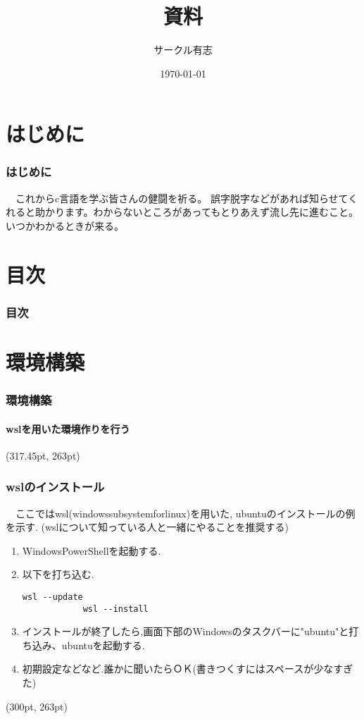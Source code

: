 \documentclass[dvipdfmx]{beamer}
\title{資料}
\author{サークル有志}
\date{\today}
\begin{document}
\begin{frame}[plain]
    \frametitle{}
    \titlepage
\end{frame}

\section{はじめに}
\begin{frame}[c]
    \frametitle{はじめに}
    　これからc言語を学ぶ皆さんの健闘を祈る。
    誤字脱字などがあれば知らせてくれると助かります。わからないところがあってもとりあえず流し先に進むこと。いつかわかるときが来る。
\end{frame}

\section{目次}
\begin{frame}[allowframebreaks]
    \frametitle{目次}
    \tableofcontents
\end{frame}

\section{環境構築}
\begin{frame}[t, fragile]
    \frametitle{環境構築}
    \framesubtitle{wslを用いた環境作りを行う}
    \tableofcontents[sections={2,3}]
    \begin{textblock*}{0.3\linewidth}(317.45pt, 263pt)
    \end{textblock*}
\end{frame}

\begin{frame}[t, fragile]
    \frametitle{wslのインストール}
    　ここではwsl(windows\space subsystem\space for\space linux)を用いた,
    ubuntuのインストールの例を示す.
    (wslについて知っている人と一緒にやることを推奨する)
    \begin{enumerate}
        \item Windows\space PowerShellを起動する.
        \item 以下を打ち込む.
        \begin{lstlisting}[gobble=9, caption=Windows\space PowerShell]
            wsl --update
            wsl --install
        \end{lstlisting}
        \item インストールが終了したら,画面下部のWindowsのタスクバーに"ubuntu"と打ち込み、ubuntuを起動する.
        \item 初期設定などなど.誰かに聞いたらＯＫ(書きつくすにはスペースが少なすぎた)
    \end{enumerate}
    \begin{textblock*}{0.3\linewidth}(300pt, 263pt)
        \space
    \end{textblock*}
\end{frame}
\end{document}
